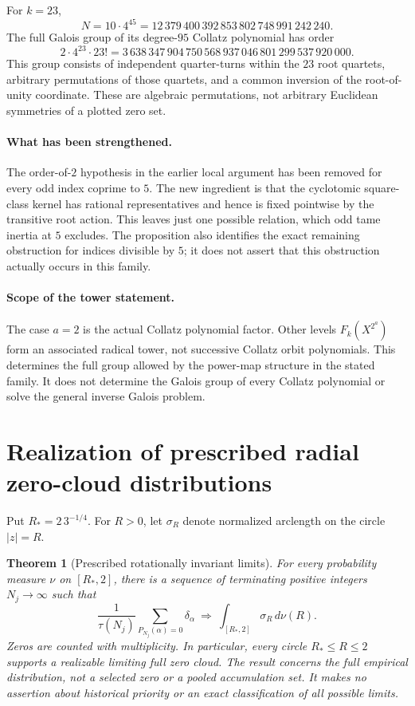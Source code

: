 \documentclass[11pt,a4paper]{article}
\newtheorem{theorem}{Theorem}[section]
\theoremstyle{definition}
\theoremstyle{remark}
\numberwithin{equation}{section}
\begin{document}
For $k=23$,
\[
 N=10\cdot4^{45}=12\,379\,400\,392\,853\,802\,748\,991\,242\,240.
\]
The full Galois group of its degree-$95$ Collatz polynomial has order
\[
 2\cdot4^{23}\cdot23!
 =3\,638\,347\,904\,750\,568\,937\,046\,801\,299\,537\,920\,000.
\]
This group consists of independent quarter-turns within the $23$ root
quartets, arbitrary permutations of those quartets, and a common inversion
of the root-of-unity coordinate. These are algebraic permutations, not
arbitrary Euclidean symmetries of a plotted zero set.

\paragraph{What has been strengthened.}
The order-of-$2$ hypothesis in the earlier local argument has been removed
for every odd index coprime to $5$. The new ingredient is that the
cyclotomic square-class kernel has rational representatives and hence is
fixed pointwise by the transitive root action. This leaves just one possible
relation, which odd tame inertia at $5$ excludes. The proposition also
identifies the exact remaining obstruction for indices divisible by $5$;
it does not assert that this obstruction actually occurs in this family.

\paragraph{Scope of the tower statement.}
The case $a=2$ is the actual Collatz polynomial factor. Other levels
$F_k(X^{2^a})$ form an associated radical tower, not successive Collatz
orbit polynomials. This determines the full group allowed by the power-map
structure in the stated family. It does not determine the Galois group of
every Collatz polynomial or solve the general inverse Galois problem.

\section{Realization of prescribed radial zero-cloud distributions}
\label{D:sec:measures}

Put $R_*=2\,3^{-1/4}$. For $R>0$, let $\sigma_R$ denote normalized
arclength on the circle $|z|=R$.

\begin{theorem}[Prescribed rotationally invariant limits]
\label{D:thm:measure}
For every probability measure $\nu$ on $[R_*,2]$, there is a sequence
of terminating positive integers $N_j\to\infty$
such that
\[
 \frac1{\tau(N_j)}\sum_{P_{N_j}(\alpha)=0}\delta_\alpha
 \ \Longrightarrow\ \int_{[R_*,2]}\sigma_R\,d\nu(R).
\]
Zeros are counted with multiplicity. In particular, every circle
$R_*\le R\le2$ supports a realizable limiting full zero cloud.
The result concerns the full empirical distribution, not a selected
zero or a pooled accumulation set. It makes no assertion about
historical priority or an exact classification of all possible limits.
\end{theorem}
\end{document}
